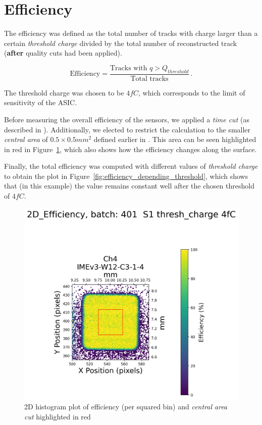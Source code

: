 

\section{Efficiency}\label{sec:efficiency}

The efficiency was defined as the total number of tracks with charge larger than a certain \textit{threshold charge} divided by the total number of reconstructed track (\textbf{after} quality cuts had been applied).

\begin{equation*}
    \text{Efficiency} = \frac{\text{Tracks with } q>Q_{threshold}}{\text{Total tracks}}  \, .
\end{equation*}

The threshold charge was chosen to be \(4\si{fC}\), which corresponds to the limit of sensitivity of the ASIC.

Before measuring the overall efficiency of the sensors, we applied a \textit{time cut} (as described in ). Additionally, we elected to restrict the calculation to the smaller \textit{central area} of \(0.5\times0.5\si{mm^2}\) defined earlier in . This area can be seen highlighted in red in Figure~\ref{fig:efficiency_2D_plot}, which also shows how the efficiency changes along the surface.

Finally, the total efficiency was computed with different values of \textit{threshold charge} to obtain the plot in Figure~\ref{fig:efficiency_depending_threshold}, which shows that (in this example) the value remains constant well after the chosen threshold of \(4\si{fC}\).

\begin{figure}
    \centering
    \includegraphics[width=0.7\linewidth]{Images/efficiency_plots/2D Efficiency_401_S1_with_center_highlight_DUTs_3.png}
    \caption{2D histogram plot of efficiency (per squared bin) and \textit{central area cut} highlighted in red}
    \label{fig:efficiency_2D_plot}
\end{figure}


